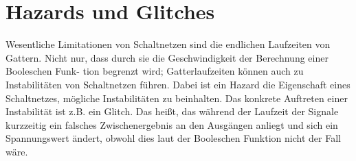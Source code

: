 \documentclass[10pt]{scrreprt}
\begin{document}
    \section{Hazards und Glitches}
    Wesentliche Limitationen von Schaltnetzen sind die endlichen Laufzeiten von Gattern.
    Nicht nur, dass durch sie die Geschwindigkeit der Berechnung einer Booleschen Funk-
    tion begrenzt wird; Gatterlaufzeiten können auch zu Instabilitäten von Schaltnetzen
    führen. Dabei ist ein Hazard die Eigenschaft eines Schaltnetzes, mögliche Instabilitäten
    zu beinhalten. Das konkrete Auftreten einer Instabilität ist z.B. ein Glitch. Das heißt,
    das während der Laufzeit der Signale kurzzeitig ein falsches Zwischenergebnis an den
    Ausgängen anliegt und sich ein Spannungswert ändert, obwohl dies laut der Booleschen
    Funktion nicht der Fall wäre.
\end{document}
